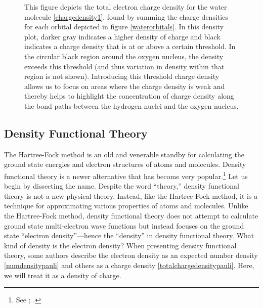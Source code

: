 \documentclass[12pt,onecolumn,secnumarabic,amsmath,amssymb,balancelastpage,nofootinbib]{article}
\begin{document}
\begin{figure}[htb]
\caption{This figure depicts the total electron charge density for the water molecule \eqref{chargedensity1}, found by summing the charge densities for each orbital depicted in figure \ref{waterorbitals}.  In this density plot, darker gray indicates a higher density of charge and black indicates a charge density that is at or above a certain threshold.  In the circular black region around the oxygen nucleus, the density exceeds this threshold (and thus variation in density within that region is not shown).  Introducing this threshold charge density allows us to focus on areas where the charge density is weak and thereby helps to highlight the concentration of charge density along the bond paths between the hydrogen nuclei and the oxygen nucleus.}
\label{water}
\end{figure}


\subsection{Density Functional Theory}\label{DFTsection}

The Hartree-Fock method is an old and venerable standby for calculating the ground state energies and electron structures of atoms and molecules.  Density functional theory is a newer alternative that has become very popular.\footnote{See \cite[pg.\ 69]{argaman2000}; \cite{becke2014}.}  Let us begin by dissecting the name.  Despite the word ``theory,'' density functional theory is not a new physical theory.  Instead, like the Hartree-Fock method, it is a technique for approximating various properties of atoms and molecules.  Unlike the Hartree-Fock method, density functional theory does not attempt to calculate ground state multi-electron wave functions but instead focuses on the ground state ``electron density''---hence the ``density'' in density functional theory.  What kind of density is the electron density?  When presenting density functional theory, some authors describe the electron density as an expected number density \eqref{numdensitypauli} and others as a charge density \eqref{totalchargedensitypauli}.  Here, we will treat it as a density of charge.
\end{document}
